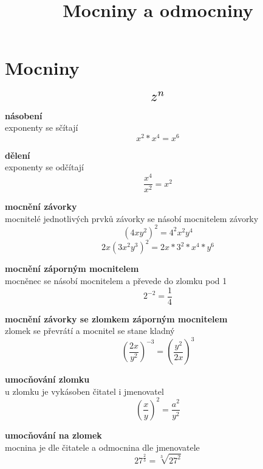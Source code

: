 \documentclass[a4paper,11pt]{article}
\title{Mocniny a odmocniny}
\begin{document}
\maketitle

\section{Mocniny}
\begin{equation*}
    \scalebox{1.6}{$
        z^n 
    $}
\end{equation*}

\begin{description}
    \item{\textbf{násobení}}\\
        exponenty se sčítají
        \begin{equation*}
            x^2 * x^4 = x^6
        \end{equation*}
    \item{\textbf{dělení}}\\
        exponenty se odčítají
        \begin{equation*}
            \frac{x^4}{x^2} = x^2
        \end{equation*}
    \item{\textbf{mocnění závorky}}\\
        mocnitelé jednotlivých prvků závorky se násobí mocnitelem závorky
        \begin{equation*}
            (4xy^2)^2 = 4^2x^2y^4
        \end{equation*}
        \begin{equation*}
            2x(3x^2y^3)^2 = 2x*3^2*x^4*y^6
        \end{equation*}
    \item{\textbf{mocnění záporným mocnitelem}}\\
        mocněnec se násobí mocnitelem a převede do zlomku pod 1
        \begin{equation*}
            2^{-2} = \frac{1}{4}
        \end{equation*}
    \item{\textbf{mocnění závorky se zlomkem záporným mocnitelem}}\\
        zlomek se převrátí a mocnitel se stane kladný
        \begin{equation*}
            \left(\frac{2x}{y^2}\right)^{-3} = \left(\frac{y^2}{2x}\right)^3
        \end{equation*}
    \item{\textbf{umocňování zlomku}}\\
        u zlomku je vykásoben čitatel i jmenovatel
        \begin{equation*}
            \left(\frac{x}{y}\right)^2 = \frac{a^2}{y^2}
        \end{equation*}
    \item{\textbf{umocňování na zlomek}}\\
        mocnina je dle čitatele a odmocnina dle jmenovatele\\
        \begin{equation*}
            27^\frac{2}{3} = \sqrt[3]{27^2}
        \end{equation*}
\end{description}
\end{document}
